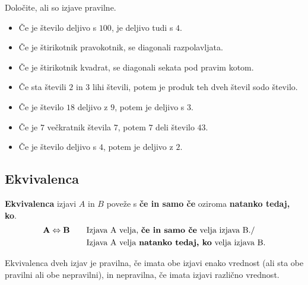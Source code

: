          
             \begin{naloga}
                Določite, ali so izjave pravilne.
                \begin{itemize}
                    \item Če je število deljivo s $100$, je deljivo tudi s $4$.
                    \item Če je štirikotnik pravokotnik, se diagonali razpolavljata.
                    \item Če je štirikotnik kvadrat, se diagonali sekata pod pravim kotom.
                    \item Če sta števili $2$ in $3$ lihi števili, potem je produk teh dveh števil sodo število.
                    \item Če je število $18$ deljivo z $9$, potem je deljivo s $3$.
                    \item Če je $7$ večkratnik števila $7$, potem $7$ deli število $43$.
                    \item Če je število deljivo s $4$, potem je deljivo z $2$.
                \end{itemize}
            \end{naloga}
         
         
             \subsection{Ekvivalenca}
                \textbf{Ekvivalenca} izjavi $A$ in $B$ poveže s \textbf{če in samo če} oziroma
                \textbf{natanko tedaj, ko}.
                \begin{align*} 
                    \mathbf{A\Leftrightarrow B} \quad \quad &\textmd{Izjava A velja, \textbf{če in
                    samo če} velja izjava B.} / \\
                        &\textmd{Izjava A velja \textbf{natanko tedaj, ko} velja izjava B.}
                \end{align*}
             


                      
                        Ekvivalenca dveh izjav je pravilna, če imata obe izjavi enako vrednost 
                        (ali sta obe pravilni ali obe nepravilni), in nepravilna, če imata izjavi
                        različno vrednost.
                     
